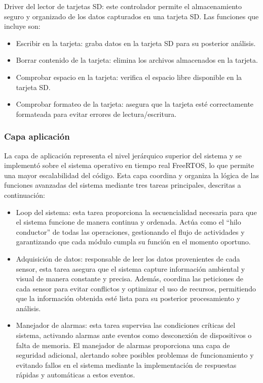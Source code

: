 Driver del lector de tarjetas SD: este controlador permite el almacenamiento seguro y organizado de los datos capturados en una tarjeta SD. Las funciones que incluye son:
\begin{itemize}
\item Escribir en la tarjeta: graba datos en la tarjeta SD para su posterior análisis.
\item Borrar contenido de la tarjeta: elimina los archivos almacenados en la tarjeta.
\item Comprobar espacio en la tarjeta: verifica el espacio libre disponible en la tarjeta SD.
\item Comprobar formateo de la tarjeta: asegura que la tarjeta esté correctamente formateada para evitar errores de lectura/escritura.
\end{itemize}

\newpage

\subsubsection{Capa aplicación}
\label{capa_aplicacion}

La capa de aplicación representa el nivel jerárquico superior del sistema y se implementó sobre el sistema operativo en tiempo real FreeRTOS, lo que permite una mayor escalabilidad del código. Esta capa coordina y organiza la lógica de las funciones avanzadas del sistema mediante tres tareas principales, descritas a continuación:

\begin{itemize}
\item Loop del sistema: esta tarea proporciona la secuencialidad necesaria para que el sistema funcione de manera continua y ordenada. Actúa como el “hilo conductor” de todas las operaciones, gestionando el flujo de actividades y garantizando que cada módulo cumpla su función en el momento oportuno.
\item Adquisición de datos: responsable de leer los datos provenientes de cada sensor, esta tarea asegura que el sistema capture información ambiental y visual de manera constante y precisa. Además, coordina las peticiones de cada sensor para evitar conflictos y optimizar el uso de recursos, permitiendo que la información obtenida esté lista para su posterior procesamiento y análisis.
\item Manejador de alarmas: esta tarea supervisa las condiciones críticas del sistema, activando alarmas ante eventos como desconexión de dispositivos o falta de memoria. El manejador de alarmas proporciona una capa de seguridad adicional, alertando sobre posibles problemas de funcionamiento y evitando fallos en el sistema mediante la implementación de respuestas rápidas y automáticas a estos eventos.
\end{itemize}

